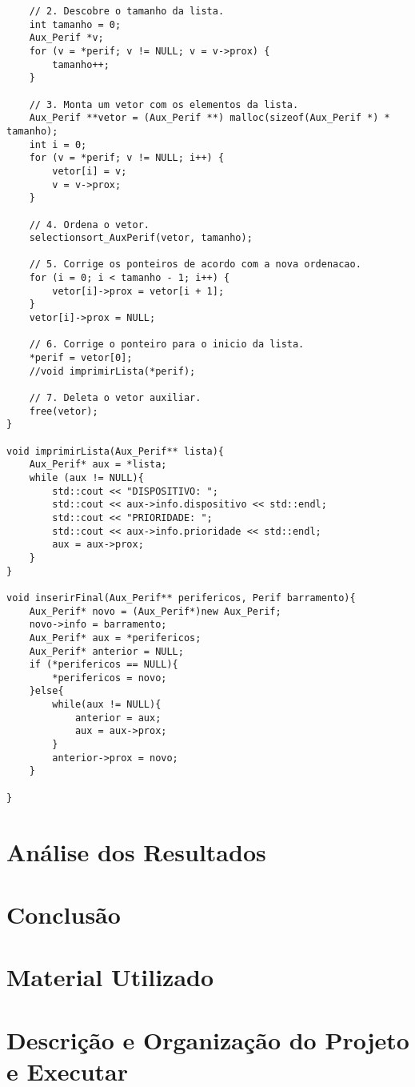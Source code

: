 \documentclass[12pt, oneside,a4paper, brazil]{abntex2}
\begin{document}
\begin{lstlisting}
    // 2. Descobre o tamanho da lista.
    int tamanho = 0;
    Aux_Perif *v;
    for (v = *perif; v != NULL; v = v->prox) {
        tamanho++;
    }

    // 3. Monta um vetor com os elementos da lista.
    Aux_Perif **vetor = (Aux_Perif **) malloc(sizeof(Aux_Perif *) * tamanho);
    int i = 0;
    for (v = *perif; v != NULL; i++) {
        vetor[i] = v;
        v = v->prox;
    }

    // 4. Ordena o vetor.
    selectionsort_AuxPerif(vetor, tamanho);

    // 5. Corrige os ponteiros de acordo com a nova ordenacao.
    for (i = 0; i < tamanho - 1; i++) {
        vetor[i]->prox = vetor[i + 1];
    }
    vetor[i]->prox = NULL;

    // 6. Corrige o ponteiro para o inicio da lista.
    *perif = vetor[0];
    //void imprimirLista(*perif);

    // 7. Deleta o vetor auxiliar.
    free(vetor);
}

void imprimirLista(Aux_Perif** lista){
	Aux_Perif* aux = *lista;
	while (aux != NULL){
		std::cout << "DISPOSITIVO: ";
		std::cout << aux->info.dispositivo << std::endl;
		std::cout << "PRIORIDADE: ";
		std::cout << aux->info.prioridade << std::endl;
		aux = aux->prox;
	}
}

void inserirFinal(Aux_Perif** perifericos, Perif barramento){
	Aux_Perif* novo = (Aux_Perif*)new Aux_Perif;
	novo->info = barramento;
	Aux_Perif* aux = *perifericos;
	Aux_Perif* anterior = NULL;
	if (*perifericos == NULL){
		*perifericos = novo;
	}else{
		while(aux != NULL){
			anterior = aux;
			aux = aux->prox;
		}
		anterior->prox = novo;
	}

}
\end{lstlisting}

\chapter{Análise dos Resultados}
\chapter{Conclusão}
\chapter{Material Utilizado}
\chapter{Descrição e Organização do Projeto e Executar}
\end{document}
